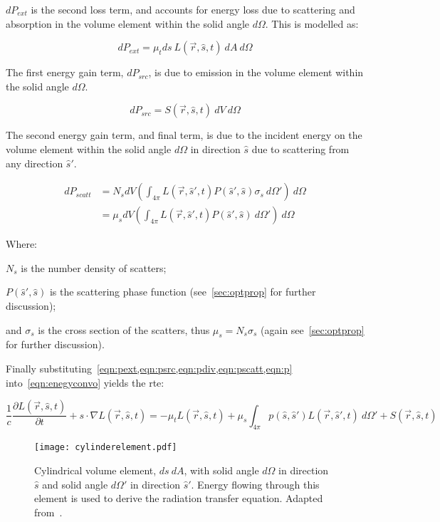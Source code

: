 $dP_{ext}$ is the second loss term, and accounts for energy loss due to scattering and absorption in the volume element within the solid angle $d\Omega$. This is modelled as:

\begin{equation}
	dP_{ext}=\mu_t ds\ L(\vec{r},\hat{s},t)\ dA\ d\Omega
	\label{eqn:pext}
\end{equation}

The first energy gain term, $dP_{src}$, is due to emission in the volume element within the solid angle $d\Omega$. 

\begin{equation}
	dP_{src}=S(\vec{r},\hat{s},t)\ dV\ d\Omega
	\label{eqn:psrc}
\end{equation}

The second energy gain term, and final term, is due to the incident energy on the volume element within the solid angle $d\Omega$ in direction $\hat{s}$ due to scattering from any direction $\hat{s}'$.

\begin{align}
	dP_{scatt}&=N_sdV\left(\int_{4\pi}L(\vec{r},\hat{s}',t)P(\hat{s}',\hat{s})\sigma_s\ d\Omega' \right)\ d\Omega \\
			  &=\mu_sdV\left(\int_{4\pi}L(\vec{r},\hat{s}',t)P(\hat{s}',\hat{s})\ d\Omega' \right)\ d\Omega 
			  \label{eqn:pscatt}
\end{align}

\noindent Where:

\indent $N_s$ is the number density of scatters;

\indent $P(\hat{s}',\hat{s})$ is the scattering phase function (see~\cref{sec:optprop} for further discussion);

\indent and $\sigma_s$ is the cross section of the scatters, thus $\mu_s=N_s\sigma_s$ (again see~\cref{sec:optprop} for further discussion).

\medskip


Finally substituting~\cref{eqn:pext,eqn:psrc,eqn:pdiv,eqn:pscatt,eqn:p} into~\cref{eqn:enegyconvo} yields the \gls*{rte}:

\begin{equation}
\frac{1}{c}\frac{\partial L(\vec{r},\hat{s},t)}{\partial t} + s\cdot \nabla L(\vec{r},\hat{s},t)=-\mu_tL(\vec{r},\hat{s},t)+\mu_s\int_{4\pi}p(\hat{s},\hat{s}')L(\vec{r},\hat{s}',t)\ d\Omega' + S(\vec{r},\hat{s},t)
\label{eqn:rte}
\end{equation}

\begin{figure}[!htb]
	\centering
	\texttt{[image: cylinderelement.pdf]}
	\caption{Cylindrical volume element, $ds\ dA$, with solid angle $d\Omega$ in direction $\hat{s}$ and solid angle $d\Omega'$ in direction $\hat{s}'$. Energy flowing through this element is used to derive the radiation transfer equation. Adapted from~\cite{wang2012biomedical,chandrasekhar2013radiative}.}
	\label{fig:energydiag2}
\end{figure}

